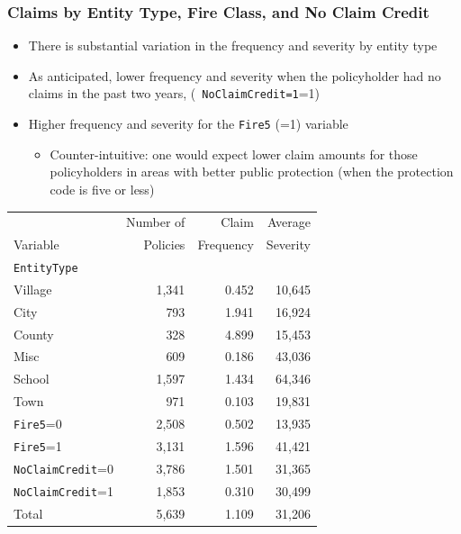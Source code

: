 \documentclass[serif,10pt]{beamer}
\begin{document}
\begin{frame}
\frametitle{Claims by Entity Type, Fire Class, and No Claim Credit}
  \begin{itemize}
\item There is substantial variation in the frequency and severity by entity
type \vspace{2mm}
\item As anticipated, lower frequency and severity when the policyholder had no claims in the past two years, ({\tt
NoClaimCredit=1}=1) \vspace{2mm}
\item Higher frequency and severity for the {\tt Fire5} (=1)
variable \vspace{2mm}
\begin{itemize}\item Counter-intuitive: one would expect lower claim amounts for those policyholders in areas with better public protection (when the protection code is five or less)
\end{itemize}\end{itemize}
\begin{table}[htp]
\begin{center}
\begin{tabular}{lrrr}
\hline
          &    Number of & Claim         & Average \\
Variable  &      Policies&      Frequency& Severity \\
\hline
 {\tt EntityType} \\
    Village               &            1,341  &            0.452  &              10,645  \\
    City                  &              793  &            1.941  &              16,924  \\
    County                &              328  &            4.899  &              15,453  \\
    Misc                  &              609  &            0.186  &              43,036  \\
    School                &            1,597  &            1.434  &              64,346  \\
    Town                  &              971  &            0.103  &              19,831  \\
    {\tt Fire5}=0         &            2,508  &            0.502  &              13,935  \\
    {\tt Fire5}=1         &            3,131  &            1.596  &              41,421  \\
    {\tt NoClaimCredit}=0 &            3,786  &            1.501  &              31,365  \\
    {\tt NoClaimCredit}=1 &            1,853  &            0.310  &              30,499  \\
    \hline
    Total                 &            5,639  &            1.109  &              31,206 \\
        \hline
    \end{tabular}
\end{center}
\end{table}
\end{frame}
\end{document}
